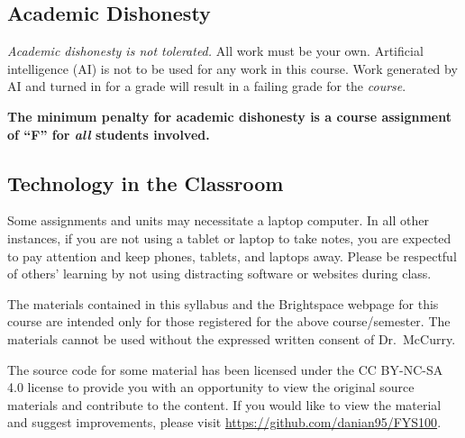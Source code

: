 \documentclass[11pt,letterpaper]{article}
\begin{document}
\subsection{Academic Dishonesty}
\emph{Academic dishonesty is not tolerated.} 
All work must be your own. Artificial intelligence (AI) is not to be used for
any work in this course. Work generated by AI and turned in for a grade will
result in a failing grade for the \emph{course}.

\begin{mdframed}
	\centering\bfseries The minimum penalty for academic dishonesty is a
	course assignment of ``F'' for \emph{all} students involved.
\end{mdframed}

\subsection{Technology in the Classroom}
Some assignments and units may necessitate a laptop computer. In all other
instances, if you are not using a tablet or laptop to take notes, you are
expected to pay attention and keep phones, tablets, and laptops away. Please be
respectful of others' learning by not using distracting software or websites
during class.


\vfill

\begin{mdframed}
	\noindent
	The materials contained in this syllabus and the
	Brightspace webpage for this course are intended only for those registered for
	the above course/semester. The materials cannot be used without the
	expressed written consent of Dr.\ McCurry.

	\bigskip

	\noindent
	The source code for some material has been licensed under the CC
	BY-NC-SA 4.0 license to provide you with an opportunity to view the
	original source materials and contribute to the content. If you would
	like to view the material and suggest improvements, please visit
	\url{https://github.com/danian95/FYS100}.
\end{mdframed}
\end{document}
